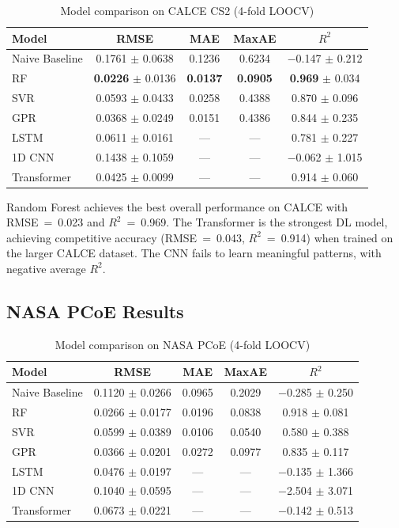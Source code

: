 \documentclass[11pt,a4paper]{article}
\begin{document}
\begin{table}[H]
\centering
\caption{Model comparison on CALCE CS2 (4-fold LOOCV)}
\label{tab:calce_results}
\begin{tabular}{lcccc}
\toprule
\textbf{Model} & \textbf{RMSE} & \textbf{MAE} & \textbf{MaxAE} & \textbf{$R^2$} \\
\midrule
Naive Baseline & 0.1761 $\pm$ 0.0638 & 0.1236 & 0.6234 & $-$0.147 $\pm$ 0.212 \\
RF & \textbf{0.0226} $\pm$ 0.0136 & \textbf{0.0137} & \textbf{0.0905} & \textbf{0.969} $\pm$ 0.034 \\
SVR & 0.0593 $\pm$ 0.0433 & 0.0258 & 0.4388 & 0.870 $\pm$ 0.096 \\
GPR & 0.0368 $\pm$ 0.0249 & 0.0151 & 0.4386 & 0.844 $\pm$ 0.235 \\
\midrule
LSTM & 0.0611 $\pm$ 0.0161 & --- & --- & 0.781 $\pm$ 0.227 \\
1D CNN & 0.1438 $\pm$ 0.1059 & --- & --- & $-$0.062 $\pm$ 1.015 \\
Transformer & 0.0425 $\pm$ 0.0099 & --- & --- & 0.914 $\pm$ 0.060 \\
\bottomrule
\end{tabular}
\end{table}

Random Forest achieves the best overall performance on CALCE with RMSE~=~0.023 and $R^2$~=~0.969. The Transformer is the strongest DL model, achieving competitive accuracy (RMSE~=~0.043, $R^2$~=~0.914) when trained on the larger CALCE dataset. The CNN fails to learn meaningful patterns, with negative average $R^2$.

\subsection{NASA PCoE Results}

\begin{table}[H]
\centering
\caption{Model comparison on NASA PCoE (4-fold LOOCV)}
\label{tab:nasa_results}
\begin{tabular}{lcccc}
\toprule
\textbf{Model} & \textbf{RMSE} & \textbf{MAE} & \textbf{MaxAE} & \textbf{$R^2$} \\
\midrule
Naive Baseline & 0.1120 $\pm$ 0.0266 & 0.0965 & 0.2029 & $-$0.285 $\pm$ 0.250 \\
RF & 0.0266 $\pm$ 0.0177 & 0.0196 & 0.0838 & 0.918 $\pm$ 0.081 \\
SVR & 0.0599 $\pm$ 0.0389 & 0.0106 & 0.0540 & 0.580 $\pm$ 0.388 \\
GPR & 0.0366 $\pm$ 0.0201 & 0.0272 & 0.0977 & 0.835 $\pm$ 0.117 \\
\midrule
LSTM & 0.0476 $\pm$ 0.0197 & --- & --- & $-$0.135 $\pm$ 1.366 \\
1D CNN & 0.1040 $\pm$ 0.0595 & --- & --- & $-$2.504 $\pm$ 3.071 \\
Transformer & 0.0673 $\pm$ 0.0221 & --- & --- & $-$0.142 $\pm$ 0.513 \\
\bottomrule
\end{tabular}
\end{table}
\end{document}
